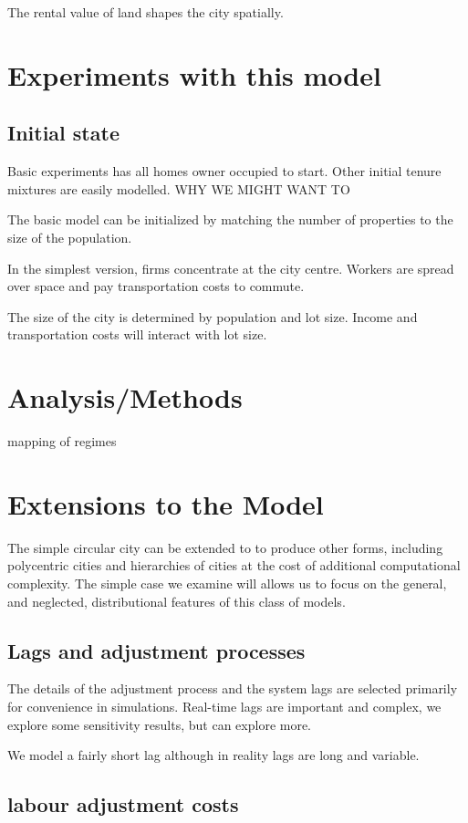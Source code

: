 The rental value of land shapes the city spatially.  

\section{Experiments with this model}
\subsection{Initial state}
Basic experiments has all homes owner occupied to start. Other initial tenure mixtures are easily modelled. WHY WE MIGHT WANT TO

The basic model can be initialized by matching the number of properties to the size of the population. 

In the simplest version, firms concentrate at the city centre. Workers are spread over space and pay transportation costs to commute.

The size of the city is determined by population and lot size. Income and transportation costs will interact with lot size. 

\section{Analysis/Methods}
mapping of regimes

\section{Extensions to the Model}
The simple circular city can be extended to to produce other forms, including polycentric cities and hierarchies of cities at the cost of additional computational complexity. The simple case we examine will allows us to focus on the general, and neglected, distributional features of this class of models.

\subsection{Lags and adjustment processes}
The details of the adjustment process and the system lags are selected primarily for convenience in simulations. Real-time lags are important and complex, we explore some sensitivity results, but can explore more. 

We model a fairly short lag although in reality lags are long and variable. 

\subsection{labour adjustment costs}

